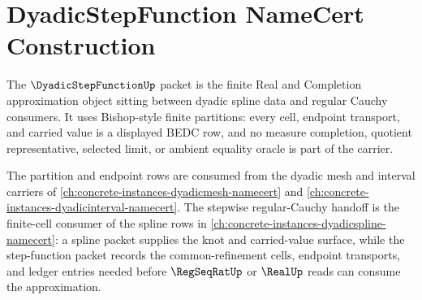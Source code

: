 \chapter{DyadicStepFunction NameCert Construction}
\label{ch:concrete-instances-dyadicstepfunction-namecert}

The $\DyadicStepFunctionUp$ packet is the finite Real and Completion approximation object sitting between dyadic spline data and regular Cauchy consumers. It uses Bishop-style finite partitions: every cell, endpoint transport, and carried value is a displayed BEDC row, and no measure completion, quotient representative, selected limit, or ambient equality oracle is part of the carrier.

The partition and endpoint rows are consumed from the dyadic mesh and interval carriers of \autoref{ch:concrete-instances-dyadicmesh-namecert} and \autoref{ch:concrete-instances-dyadicinterval-namecert}. The stepwise regular-Cauchy handoff is the finite-cell consumer of the spline rows in \autoref{ch:concrete-instances-dyadicspline-namecert}: a spline packet supplies the knot and carried-value surface, while the step-function packet records the common-refinement cells, endpoint transports, and ledger entries needed before $\RegSeqRatUp$ or $\RealUp$ reads can consume the approximation.

